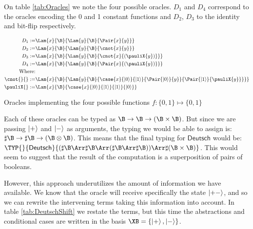 On table \ref{tab:Oracles} we note the four possible oracles. $D_1$ and $D_4$ correspond to the oracles encoding the 0 and 1 constant functions and $D_2$, $D_3$ to the identity and bit-flip respectively.

\begin{table*}
    \scriptsize
    \begin{align*}
        D_1 :=& \Lam{x}{\B}{\Lam{y}{\B}{\Pair{x}{y}}}\\
        D_2 :=& \Lam{x}{\B}{\Lam{y}{\B}{\cnot{x}{y}}}\\
        D_3 :=& \Lam{x}{\B}{\Lam{y}{\B}{\cnot{x}{(\pauliX{y})}}}\\
        D_4 :=& \Lam{x}{\B}{\Lam{y}{\B}{\Pair{x}{(\pauliX{y})}}}\\
        \text{Where:} &\\
        \cnot{}{} :=& \Lam{x}{\B}{\Lam{y}{\B}{
        \case{x}
        {\ket{0}}{\ket{1}}
        {\Pair{\ket{0}}{y}}{\Pair{\ket{1}}{\pauliX{y}}}}}\\
        \pauliX{} :=& \Lam{x}{\B}{\case{x}{\ket{0}}{\ket{1}}{\ket{1}}{\ket{0}}}
    \end{align*}
    
    \caption{Oracles implementing the four possible functions $f:\{0,1\}\mapsto\{0,1\}$}
    \label{tab:Oracles}
\end{table*}

Each of these oracles can be typed as $\B\to\B\to(\B\times\B)$. But since we are passing $\left\vert{+}\right\rangle$ and $\left\vert{-}\right\rangle$ as arguments, the typing we would be able to assign is: $\sharp\B\to\sharp\B\to(\B\otimes\B)$. This means that the final typing for $\mathsf{Deutsch}$ would be: $\TYP{}{\mathsf{Deutsch}}{(\sharp\B\Arr\sharp\B\Arr(\sharp\B\Arr\sharp\B))\Arr\sharp(\B\times\B)}$. This would seem to suggest that the result of the computation is a superposition of pairs of booleans.

However, this approach underutilizes the amount of information we have available. We know that the oracle will receive specifically the state $\left\vert{+-}\right\rangle$, and so we can rewrite the intervening terms taking this information into account. In table \ref{tab:DeutschShift} we restate the terms, but this time the abstractions and conditional cases are written in the basis $\XB=\{\ket{+},\ket{-}\}$.

